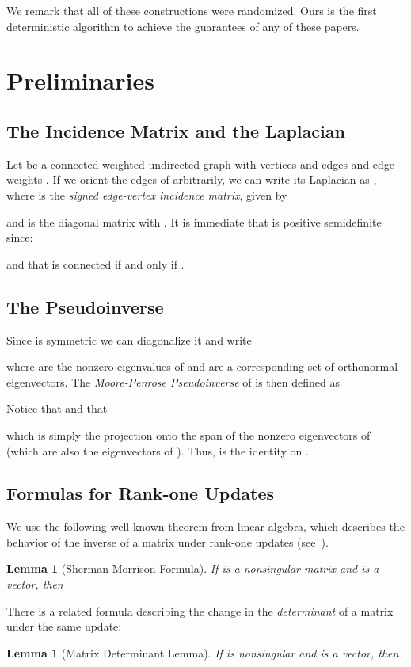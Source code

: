\documentclass[12pt]{article}
\newtheorem{lemma}[theorem]{Lemma}
\begin{document}
We remark that all of these constructions were randomized.
Ours is the first deterministic algorithm to achieve the guarantees of any
  of these papers.


\section{Preliminaries}
\subsection{The Incidence Matrix and the Laplacian} \label{sec:incidence}
Let  be a connected weighted undirected graph with  vertices and 
edges and edge weights . If we orient the edges of 
arbitrarily, we can write its Laplacian as , where  is the
{\em signed edge-vertex incidence matrix}, given by

and  is the diagonal matrix with . 
It is immediate that  is positive semidefinite since:

\noindent and that  is connected if and only if
 .



\subsection{The Pseudoinverse}\label{sec:pseudo}
Since  is symmetric we can diagonalize it and write

where  are the nonzero eigenvalues of  and
 are a corresponding set of orthonormal eigenvectors. The {\em
Moore-Penrose Pseudoinverse} of  is then defined as

Notice that  and that

which is simply the projection onto the span of the
nonzero eigenvectors of  (which are also the eigenvectors of ). Thus,  is the identity on
.

\subsection{Formulas for Rank-one Updates}
We use the following well-known theorem from linear algebra, which describes
the behavior of the inverse of a matrix under rank-one updates 
  (see~\cite[Section 2.1.3]{GolubVanLoan}).
\begin{lemma}[Sherman-Morrison Formula] If  is a nonsingular  matrix and  is a vector, then 

\end{lemma}
There is a related formula describing the change in the {\em determinant} of
  a matrix under the same update:
\begin{lemma}[Matrix Determinant Lemma] \label{lem:matrixdet} If  is nonsingular and  is a vector, then
\end{lemma}
\end{document}

